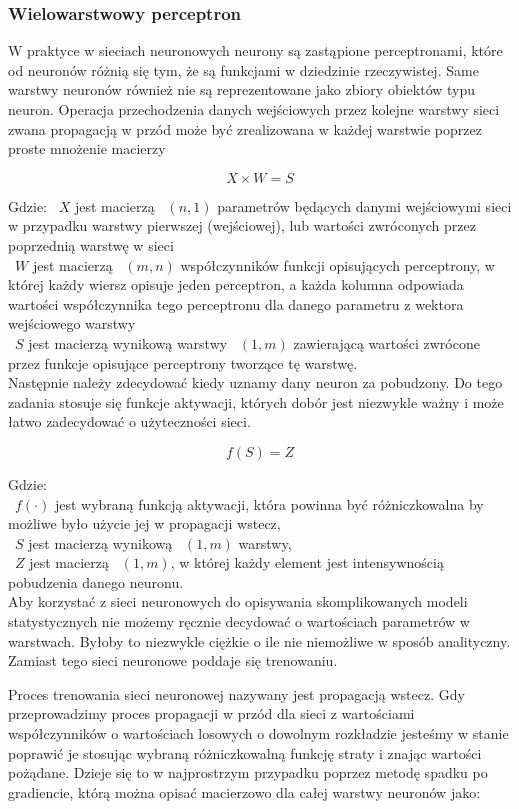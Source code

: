 \documentclass{article}
\begin{document}
\subsubsection{Wielowarstwowy perceptron}

W praktyce w sieciach neuronowych neurony są zastąpione perceptronami, które od neuronów różnią się tym, że są funkcjami w dziedzinie rzeczywistej.
Same warstwy neuronów również nie są reprezentowane jako zbiory obiektów typu neuron. Operacja przechodzenia danych wejściowych przez kolejne warstwy sieci
zwana propagacją w przód może być zrealizowana w każdej warstwie poprzez proste mnożenie macierzy

$$ X \times W=S $$

Gdzie:
 ~$X$ jest macierzą ~$(n, 1)$ parametrów będących danymi wejściowymi sieci w przypadku warstwy pierwszej (wejściowej), lub wartości zwróconych przez
poprzednią warstwę w sieci\\
~$W$ jest macierzą ~$(m, n)$ współczynników funkcji opisujących perceptrony, w której każdy wiersz opisuje jeden perceptron, a każda kolumna odpowiada wartości 
współczynnika tego perceptronu dla danego parametru z wektora wejściowego warstwy\\
~$S$ jest macierzą wynikową warstwy ~$(1, m)$ zawierającą wartości zwrócone przez funkcje opisujące perceptrony tworzące tę warstwę.\\

Następnie należy zdecydować kiedy uznamy dany neuron za pobudzony. Do tego zadania stosuje się funkcje aktywacji, których dobór jest niezwykle ważny
i może łatwo zadecydować o użyteczności sieci.

$$ f(S) = Z $$

Gdzie:\\
~$f(\cdot)$ jest wybraną funkcją aktywacji, która powinna być różniczkowalna by możliwe było użycie jej w propagacji wstecz,\\
~$S$ jest macierzą wynikową ~$(1, m)$ warstwy,\\
~$Z$ jest macierzą ~$(1, m)$, w której każdy element jest intensywnością pobudzenia danego neuronu.\\

Aby korzystać z sieci neuronowych do opisywania skomplikowanych modeli statystycznych nie możemy ręcznie decydować o wartościach parametrów w warstwach. 
Byłoby to niezwykle ciężkie o ile nie niemożliwe w sposób analityczny. Zamiast tego sieci neuronowe poddaje się trenowaniu.

Proces trenowania sieci neuronowej nazywany jest propagacją wstecz. Gdy przeprowadzimy proces propagacji w przód dla sieci z wartościami współczynników
o wartościach losowych o dowolnym rozkładzie jesteśmy w stanie poprawić je stosując wybraną różniczkowalną funkcję straty i znając wartości pożądane. Dzieje się to 
w najprostrzym przypadku poprzez metodę spadku po gradiencie, którą można opisać macierzowo dla całej warstwy neuronów jako:
\end{document}
